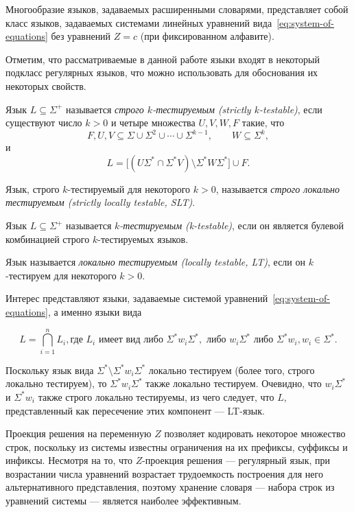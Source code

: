 \documentclass[fontsize=14pt]{scrartcl}
\begin{document}
  Многообразие языков, задаваемых расширенными словарями, представляет собой класс языков, задаваемых системами линейных уравнений вида~\ref{eq:system-of-equations} без 
  уравнений $Z = c$ (при фиксированном алфавите).

  Отметим, что рассматриваемые в данной работе языки входят в некоторый подкласс регулярных языков, что можно использовать
  для обоснования их некоторых свойств.

  \begin{Definition}
    Язык $L \subseteq \Sigma^+$ называется \emph{строго $k$-тестируемым (strictly $k$-testable)},
    если существуют число $k>0$ и четыре множества $U,V,W,F$ такие, что
    \[
    F, U, V \subseteq \Sigma \cup \Sigma^2 \cup \cdots \cup \Sigma^{k-1},
    \qquad
    W \subseteq \Sigma^k,
    \]
    и
    \[
    L=\big[(U\Sigma^* \cap \Sigma^*V)\setminus \Sigma^*W\Sigma^*\big]\cup F.
    \]
    
    Язык, строго $k$-тестируемый для некоторого $k>0$, называется \emph{строго локально тестируемым (strictly locally testable, SLT)}.
    \end{Definition}
    
    \begin{Definition}
    Язык $L \subseteq \Sigma^+$ называется \emph{$k$-тестируемым (k-testable)}, если он является булевой
    комбинацией строго $k$-тестируемых языков.
    
    Язык называется \emph{локально тестируемым (locally testable, LT)}, если он $k$-тестируем для некоторого $k>0$.
    \end{Definition}
    
  
    Интерес представляют языки, задаваемые системой уравнений~\ref{eq:system-of-equations}, а именно языки вида 

    \begin{equation}
    L = \bigcap_{i=1}^n L_i, \text{где } L_i \text{ имеет вид либо } \Sigma^* w_i \Sigma^*, 
    \text{ либо } w_i \Sigma^* \text{ либо } \Sigma^* w_i , w_i \in \Sigma^*.
    \end{equation}
    
    Поскольку язык вида $\Sigma^* \setminus \Sigma^* w_i \Sigma^*$ локально тестируем (более того, строго локально тестируем),
    то $\Sigma^* w_i \Sigma^*$ также локально тестируем. Очевидно, что $w_i \Sigma^*$ и $\Sigma^* w_i$ также строго локально тестируемы,
    из чего следует, что $L$, представленный как пересечение этих компонент --- LT-язык.
    
    Проекция решения на переменную $Z$ позволяет кодировать некоторое множество строк, поскольку из системы известны
    ограничения на их префиксы, суффиксы и инфиксы. Несмотря на то, что $Z$-проекция решения --- регулярный язык,
    при возрастании числа уравнений возрастает трудоемкость построения для него альтернативного представления, поэтому
    хранение словаря --- набора строк из уравнений системы --- является наиболее эффективным. 
    
\end{document}
